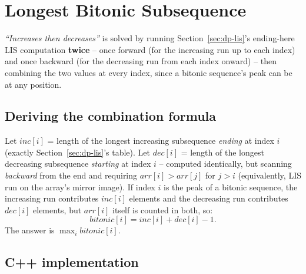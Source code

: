 \section{Longest Bitonic Subsequence}
\label{sec:dp-longest-bitonic-subsequence}


\begin{patternbox}
\emph{``Increases then decreases''} is solved by running
Section~\ref{sec:dp-lis}'s ending-here LIS computation \textbf{twice} --
once forward (for the increasing run up to each index) and once
backward (for the decreasing run from each index onward) -- then
combining the two values at every index, since a bitonic sequence's
peak can be at any position.
\end{patternbox}

\subsection*{Deriving the combination formula}

Let $\textit{inc}[i]$ = length of the longest increasing subsequence
\emph{ending} at index $i$ (exactly Section~\ref{sec:dp-lis}'s table).
Let $\textit{dec}[i]$ = length of the longest decreasing subsequence
\emph{starting} at index $i$ -- computed identically, but scanning
\emph{backward} from the end and requiring $\textit{arr}[i] >
\textit{arr}[j]$ for $j>i$ (equivalently, LIS run on the array's mirror
image). If index $i$ is the peak of a bitonic sequence, the increasing
run contributes $\textit{inc}[i]$ elements and the decreasing run
contributes $\textit{dec}[i]$ elements, but $\textit{arr}[i]$ itself is
counted in both, so:
\[
  \textit{bitonic}[i] = \textit{inc}[i] + \textit{dec}[i] - 1.
\]
The answer is $\max_i \textit{bitonic}[i]$.

\subsection*{C++ implementation}

